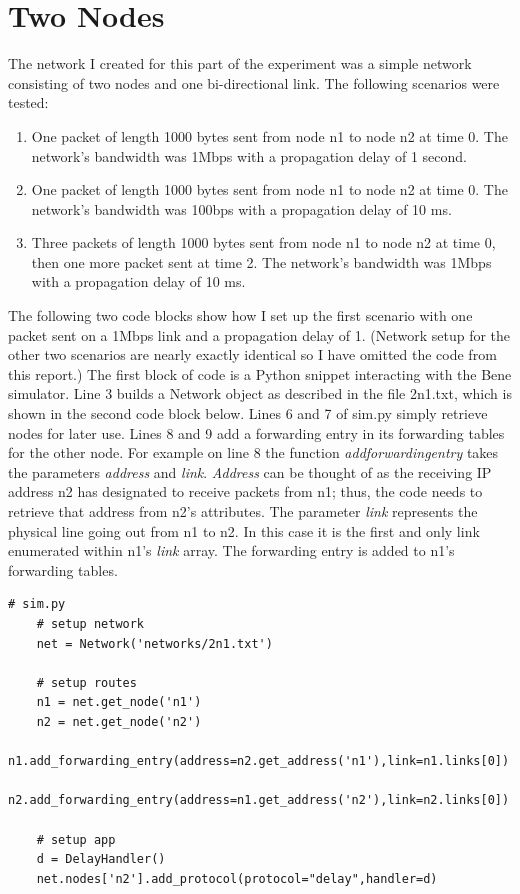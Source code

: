 \documentclass[11pt]{article}
\begin{document}
\section{Two Nodes}

The network I created for this part of the experiment was a simple network consisting of two nodes and one bi-directional link. The following scenarios were tested:

\begin{enumerate}

\item One packet of length 1000 bytes sent from node n1 to node n2 at time 0. The network's bandwidth was 1Mbps with a propagation delay of 1 second.

\item One packet of length 1000 bytes sent from node n1 to node n2 at time 0. The network's bandwidth was 100bps with a propagation delay of 10 ms.

\item Three packets of length 1000 bytes sent from node n1 to node n2 at time 0, then one more packet sent at time 2. The network's bandwidth was 1Mbps with a propagation delay of 10 ms.

\end{enumerate}

The following two code blocks show how I set up the first scenario with one packet sent on a 1Mbps link and a propagation delay of 1. (Network setup for the other two scenarios are nearly exactly identical so I have omitted the code from this report.) The first block of code is a Python snippet interacting with the Bene simulator. Line 3 builds a Network object as described in the file 2n1.txt, which is shown in the second code block below. Lines 6 and 7 of sim.py simply retrieve nodes for later use. Lines 8 and 9 add a forwarding entry in its forwarding tables for the other node. For example on line 8 the function \emph{add\textunderscore forwarding\textunderscore entry} takes the parameters \emph{address} and \emph{link}. \emph{Address} can be thought of as the receiving IP address n2 has designated to receive packets from n1; thus, the code needs to retrieve that address from n2's attributes. The parameter \emph{link} represents the physical line going out from n1 to n2. In this case it is the first and only link enumerated within n1's \emph{link} array. The forwarding entry is added to n1's forwarding tables.

\vspace{5mm}
\begin{absolutelynopagebreak}
\begin{lstlisting}
# sim.py
    # setup network
    net = Network('networks/2n1.txt')

    # setup routes
    n1 = net.get_node('n1')
    n2 = net.get_node('n2')
    n1.add_forwarding_entry(address=n2.get_address('n1'),link=n1.links[0])
    n2.add_forwarding_entry(address=n1.get_address('n2'),link=n2.links[0])

    # setup app
    d = DelayHandler()
    net.nodes['n2'].add_protocol(protocol="delay",handler=d)
\end{lstlisting}
\end{absolutelynopagebreak}
\vspace{5mm}
\end{document}

